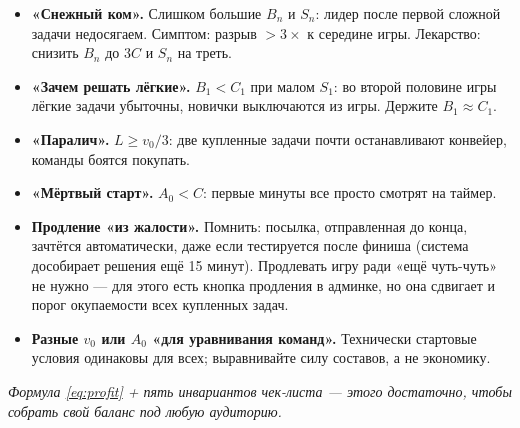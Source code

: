 \documentclass[12pt,a4paper]{article}
\newcommand{\A}{A_0}
\newcommand{\vv}{v_0}
\begin{document}
\begin{itemize}[itemsep=2pt]
\item \textbf{«Снежный ком».} Слишком большие $B_n$ и $S_n$: лидер
после первой сложной задачи недосягаем. Симптом: разрыв $>3\times$
к середине игры. Лекарство: снизить $B_n$ до $3C$ и $S_n$ на треть.
\item \textbf{«Зачем решать лёгкие».} $B_1 < C_1$ при малом $S_1$:
во второй половине игры лёгкие задачи убыточны, новички выключаются
из игры. Держите $B_1 \approx C_1$.
\item \textbf{«Паралич».} $L \ge \vv/3$: две купленные задачи почти
останавливают конвейер, команды боятся покупать.
\item \textbf{«Мёртвый старт».} $\A < C$: первые минуты все просто
смотрят на таймер.
\item \textbf{Продление «из жалости».} Помнить: посылка, отправленная
до конца, зачтётся автоматически, даже если тестируется после финиша
(система дособирает решения ещё 15 минут). Продлевать игру ради
«ещё чуть-чуть» не нужно --- для этого есть кнопка продления в админке,
но она сдвигает и порог окупаемости всех купленных задач.
\item \textbf{Разные $\vv$ или $\A$ «для уравнивания команд».}
Технически стартовые условия одинаковы для всех; выравнивайте силу
составов, а не экономику.
\end{itemize}

\vspace{1em}
\begin{center}
\emph{Формула \eqref{eq:profit} + пять инвариантов чек-листа ---
этого достаточно, чтобы собрать свой баланс под любую аудиторию.}
\end{center}
\end{document}
